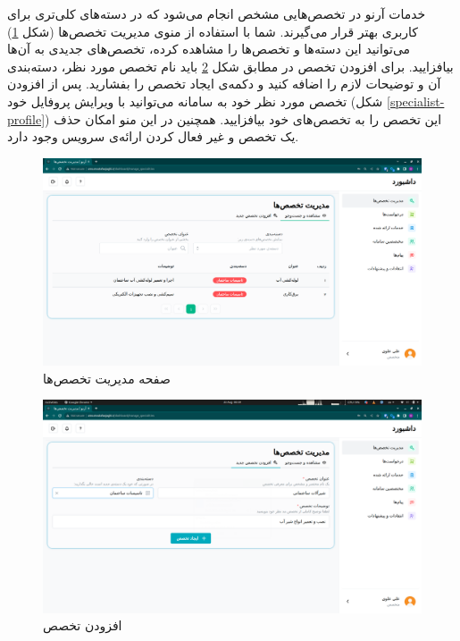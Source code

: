 \FloatBarrier
خدمات آرنو در تخصص‌هایی مشخص انجام می‌شود که در دسته‌های کلی‌تری برای کاربری بهتر قرار می‌گیرند.
شما با استفاده از منوی مدیریت تخصص‌ها (شکل \ref{specialist-manage-specialities})  می‌توانید این دسته‌ها و تخصص‌ها را مشاهده کرده، تخصص‌های جدیدی به آن‌ها بیافزایید.
برای افزودن تخصص در مطابق شکل \ref{specialist-add-speciality} باید نام تخصص مورد نظر، دسته‌بندی آن و توضیحات لازم را اضافه کنید و دکمه‌ی ایجاد تخصص را بفشارید.
پس از افزودن تخصص مورد نظر خود به سامانه می‌توانید با ویرایش پروفایل خود (شکل \ref{specialist-profile}) این تخصص را به تخصص‌های خود بیافزایید.
همچنین در این منو امکان حذف یک تخصص و غیر فعال کردن ارائه‌ی سرویس وجود دارد.

\begin{figure}[h]
	\centering
	\includegraphics[width=\textwidth]{figs/user-guide/specialist-manage-specialities}
	\caption{صفحه مدیریت تخصص‌ها}
	\label{specialist-manage-specialities}
\end{figure}

\begin{figure}[h]
	\centering
	\includegraphics[width=\textwidth]{figs/user-guide/specialist-add-speciality}
	\caption{افزودن تخصص}
	\label{specialist-add-speciality}
\end{figure}

